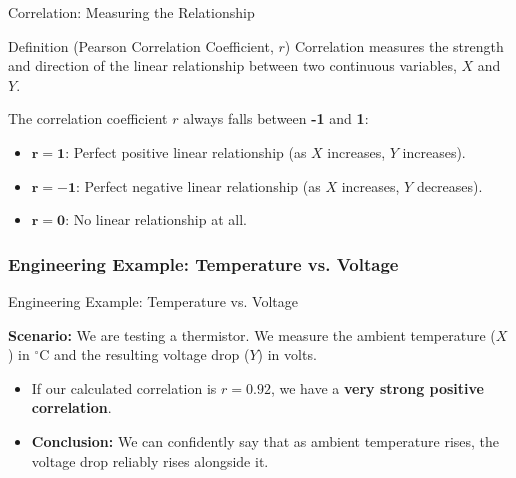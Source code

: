 \begin{frame}{Correlation: Measuring the Relationship}
    
    \begin{block}{Definition (Pearson Correlation Coefficient, $r$)}
        Correlation measures the strength and direction of the linear relationship between two continuous variables, $X$ and $Y$. 
    \end{block}
    
    The correlation coefficient $r$ always falls between \textbf{-1} and \textbf{1}:
    \begin{itemize}
        \item $\mathbf{r = 1}$: Perfect positive linear relationship (as $X$ increases, $Y$ increases).
        \item $\mathbf{r = -1}$: Perfect negative linear relationship (as $X$ increases, $Y$ decreases).
        \item $\mathbf{r = 0}$: No linear relationship at all.
    \end{itemize}
\end{frame}

\subsubsection{Engineering Example: Temperature vs. Voltage}
\begin{frame}{Engineering Example: Temperature vs. Voltage}
    
    \def\boxwidth{\textwidth} 
    \mode<beamer>{\def\boxwidth{0.75\textwidth}} 
    
    \begin{minipage}{\boxwidth}
        \textbf{Scenario:} We are testing a thermistor. We measure the ambient temperature ($X$) in $^\circ$C and the resulting voltage drop ($Y$) in volts. \vspace{0.5cm}
        
        \begin{itemize}
            \item If our calculated correlation is $r = 0.92$, we have a \textbf{very strong positive correlation}.
            \item \textbf{Conclusion:} We can confidently say that as ambient temperature rises, the voltage drop reliably rises alongside it.
        \end{itemize}
    \end{minipage}%
\end{frame}
